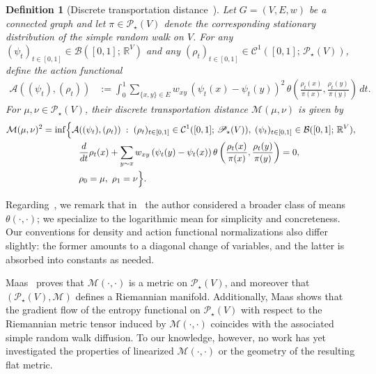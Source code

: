\documentclass[11pt,a4paper]{article}
\newcommand{\Maas}{\mathcal{M}}
\newcommand{\Prob}{\mathscr{P}}
\newtheorem{definition}[theorem]{Definition}
\begin{document}
\begin{definition}[Discrete transportation distance~\cite{maas2011gradient}]\label{defn:mass-distance}
    Let $G=(V,E, w)$ be a connected graph and let $\pi\in\Prob_\star (V)$ denote the corresponding stationary distribution of the simple random walk on $V$. For any $(\psi_t)_{t\in[0,1]}\in \mathcal{B}([0, 1];\, \mathbb{R}^{V})$ and any $(\rho_t)_{t\in[0,1]}\in \mathcal{C}^{1}([0, 1];\, \Prob_\star (V))$, define the \emph{action functional}
        \begin{align}\label{eq:action-functional}
            \mathcal{A}((\psi_t), (\rho_t)) &:=  \int_0^{1} \sum_{\{x, y\}\in E} w_{xy}\, (\psi_t(x) - \psi_t(y))^2\, \theta\left(\frac{\rho_t(x)}{\pi(x)}, \frac{\rho_t(y)}{\pi(y)}\right)\, dt.
        \end{align}
    For $\mu,\nu\in\Prob_\star(V)$, their \emph{discrete transportation distance} $\Maas (\mu,\nu)$ is given by
        \begin{align}\label{eq:defn-maas-distance}
            \Maas (\mu,\nu)^2 &= \inf\Bigl\{ \mathcal{A}((\psi_t), (\rho_t)) \;:\; (\rho_t)_{t\in[0,1]}\in \mathcal{C}^{1}([0, 1];\,\Prob_\star(V)),\; (\psi_t)_{t\in[0,1]}\in \mathcal{B}([0, 1];\,\mathbb{R}^{V}),\notag\\
            &\qquad\qquad \frac{d}{dt}\rho_t(x) + \sum_{y\sim x} w_{xy}\, (\psi_t(y) - \psi_t(x))\, \theta\left(\frac{\rho_t(x)}{\pi(x)}, \frac{\rho_t(y)}{\pi(y)}\right) = 0,\notag\\
            &\qquad\qquad \rho_0 = \mu,\ \rho_1 = \nu \Bigr\}.
        \end{align}
\end{definition}

Regarding~, we remark that in~\cite{maas2011gradient} the author considered a broader class of means $\theta(\cdot,\cdot)$; we specialize to the logarithmic mean for simplicity and concreteness. Our conventions for density and action functional normalizations also differ slightly: the former amounts to a diagonal change of variables, and the latter is absorbed into constants as needed.

Maas~\cite[Theorem 1.1]{maas2011gradient} proves that $\Maas(\cdot,\cdot)$ is a metric on $\Prob_\star(V)$, and moreover that $(\Prob_\star(V),\Maas)$ defines a Riemannian manifold. Additionally, Maas shows that the gradient flow of the entropy functional on $\Prob_\star(V)$ with respect to the Riemannian metric tensor induced by $\Maas(\cdot,\cdot)$ coincides with the associated simple random walk diffusion. To our knowledge, however, no work has yet investigated the properties of linearized $\Maas(\cdot,\cdot)$ or the geometry of the resulting flat metric. 
\end{document}
